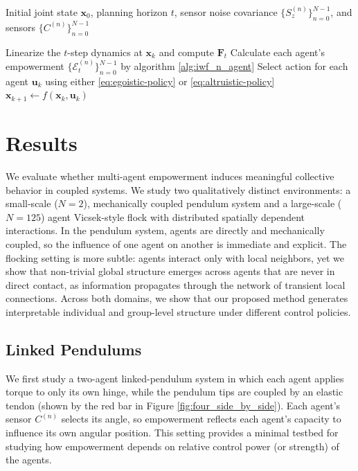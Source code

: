 \documentclass{article} %
\begin{document}
\begin{algorithm}[h]
\caption{Online Multi-Agent Iterative Water-Filling for Control}
\label{alg:interaction}
\begin{algorithmic}[1]
\REQUIRE Initial joint state $\mathbf{x}_0$, planning horizon $t$, sensor noise covariance $\{S_z^{(n)}\}_{n=0}^{N-1}$, and sensors $\{C^{(n)}\}_{n=0}^{N-1}$

    \STATE Linearize the $t$-step dynamics at $\mathbf{x}_k$ and compute $\mathbf{F}_t$
    \STATE Calculate each agent's empowerment $\{\mathcal{E}_t^{(n)}\}_{n=0}^{N-1}$ by algorithm \ref{alg:iwf_n_agent}
    \STATE Select action for each agent $\mathbf{u}_k$ using either \eqref{eq:egoistic-policy} or \eqref{eq:altruistic-policy}
    \STATE $\mathbf{x}_{k+1} \leftarrow f(\mathbf{x}_k, \mathbf{u}_k)$
\ENDFOR
\end{algorithmic}
\end{algorithm}

\section{Results}

We evaluate whether multi-agent empowerment induces meaningful collective behavior in coupled systems. We study two qualitatively distinct environments: a small-scale ($N=2$), mechanically coupled pendulum system and a large-scale ($N=125$) agent Vicsek-style flock with distributed spatially dependent interactions. In the pendulum system, agents are directly and mechanically coupled, so the influence of one agent on another is immediate and explicit. The flocking setting is more subtle: agents interact only with local neighbors, yet we show that non-trivial global structure emerges across agents that are never in direct contact, as information propagates through the network of transient local connections. Across both domains, we show that our proposed method generates interpretable individual and group-level structure under different control policies.

\subsection{Linked Pendulums}

We first study a two-agent linked-pendulum system in which each agent applies torque to only its own hinge, while the pendulum tips are coupled by an elastic tendon (shown by the red bar in Figure \ref{fig:four_side_by_side}). Each agent's sensor $C^{(n)}$ selects its angle, so empowerment reflects each agent's capacity to influence its own angular position. This setting provides a minimal testbed for studying how empowerment depends on relative control power (or strength) of the agents.
\end{document}
